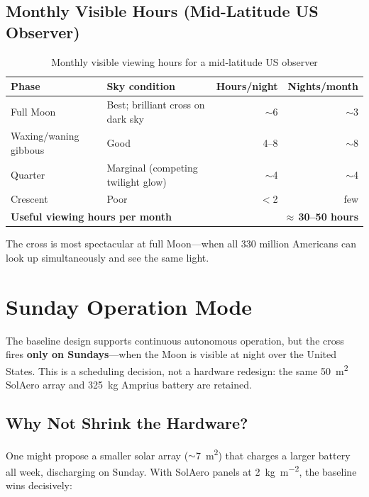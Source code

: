 \documentclass[10pt,letterpaper]{article}
\begin{document}
\subsection{Monthly Visible Hours (Mid-Latitude US Observer)}

\begin{table}[!ht]
\centering\small
\caption{Monthly visible viewing hours for a mid-latitude US observer}
\label{tab:viewing-hours}
\begin{tabularx}{\linewidth}{lXrr}
\toprule
\textbf{Phase} & \textbf{Sky condition} & \textbf{Hours/night} & \textbf{Nights/month} \\
\midrule
Full Moon & Best; brilliant cross on dark sky & $\sim$6 & $\sim$3 \\
Waxing/waning gibbous & Good & 4--8 & $\sim$8 \\
Quarter & Marginal (competing twilight glow) & $\sim$4 & $\sim$4 \\
Crescent & Poor & $<$2 & few \\
\midrule
\multicolumn{2}{l}{\textbf{Useful viewing hours per month}} & \multicolumn{2}{r}{\textbf{$\approx$\,30--50 hours}} \\
\bottomrule
\end{tabularx}
\end{table}

The cross is most spectacular at full Moon---when all 330 million Americans can
look up simultaneously and see the same light.

\section{Sunday Operation Mode}

The baseline design supports continuous autonomous operation, but the cross
fires \textbf{only on Sundays}---when the Moon is visible at night over the
United States. This is a scheduling decision, not a hardware redesign: the
same \SI{50}{\meter\squared} SolAero array and \SI{325}{\kilo\gram} Amprius
battery are retained.

\subsection{Why Not Shrink the Hardware?}

One might propose a smaller solar array ($\sim$\SI{7}{\meter\squared}) that
charges a larger battery all week, discharging on Sunday. With SolAero panels
at \SI{2}{\kilo\gram\per\meter\squared}, the baseline wins decisively:
\end{document}
